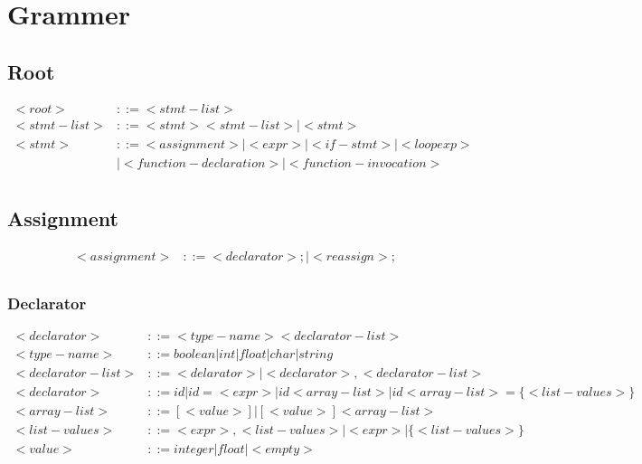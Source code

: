 \documentclass{report}
\begin{document}
\chapter{Grammer}

\section{Root}

\begin{equation}
\begin{split}
  <root> & ::= <stmt-list> \\
  <stmt-list> & ::= <stmt> <stmt-list> | <stmt> \\
  <stmt> & ::= <assignment> | <expr> | <if-stmt> | <loopexp> \\
  &| <function-declaration> | <function-invocation> \\
\end{split}
\end{equation}

\section{Assignment}

\begin{equation}
\begin{split}
  <assignment> & ::= <declarator>; | <reassign>; \\
\end{split}
\end{equation}

\subsection{Declarator}

\begin{equation}
\begin{split}
  <declarator> & ::= <type-name>  <declarator-list> \\
  <type-name> & ::= boolean  |  int  |  float  |  char  |  string \\
  <declarator-list> & ::= <delarator> | <declarator>, <declarator-list> \\
  <declarator> & ::= id  | id = <expr> | id<array-list> | id<array-list> = \{ <list-values> \} \\
  <array-list> & ::= [<value>] | [<value>]<array-list> \\
  <list-values> & ::= <expr>, <list-values> | <expr> | \{ <list-values> \} \\
  <value> & ::= integer | float | <empty> \\
\end{split}
\end{equation}
\end{document}
